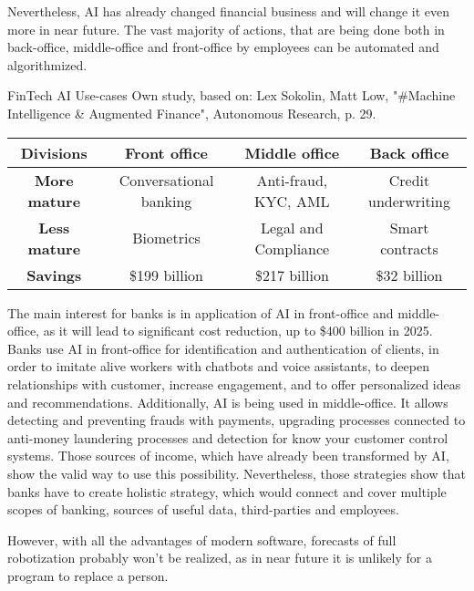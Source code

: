 Nevertheless, AI has already changed financial business and will change it even more in near future.
The vast majority of actions, that are being done both in back-office, middle-office and front-office by employees can be automated and algorithmized.

\mttable
{FinTech AI Use-cases}
{Own study, based on: Lex Sokolin, Matt Low, "\#Machine Intelligence \& Augmented Finance", \allowbreak Autonomous Research, p. 29.}
{
    \begin{tabular}{| c | c | c | c |}
        \hline 
        \textbf{Divisions} &
            Front office & 
            Middle office & 
            Back office \\ \hline 
       
        \textbf{More mature} & 
            Conversational banking & 
            Anti-fraud, KYC, AML & 
            Credit underwriting \\ \hline 
       
        \textbf{Less mature} & 
            Biometrics & 
            Legal and Compliance &
            Smart contracts \\ \hline 
        \textbf{Savings} &
            \$199 billion &
            \$217 billion &
            \$32 billion \\
        \hline 
    \end{tabular}
}

The main interest for banks is in application of AI in front-office and middle-office, as it will lead to significant cost reduction, up to \$400 billion in 2025.
Banks use AI in front-office for identification and authentication of clients, in order to imitate alive workers with chatbots and voice assistants, to deepen relationships with customer, increase engagement, and to offer personalized ideas and recommendations.
Additionally, AI is being used in middle-office.
It allows detecting and preventing frauds with payments, upgrading processes connected to anti-money laundering processes and detection for know your customer control systems.
Those sources of income, which have already been transformed by AI, show the valid way to use this possibility.
Nevertheless, those strategies show that banks have to create holistic strategy, which would connect and cover multiple scopes of banking, sources of useful data, third-parties and employees.
\cite{autonomous_next}

However, with all the advantages of modern software, forecasts of full robotization probably won't be realized, as in near future it is unlikely for a program to replace a person.
\cite{deluxe_mid_size_banks_risk}

